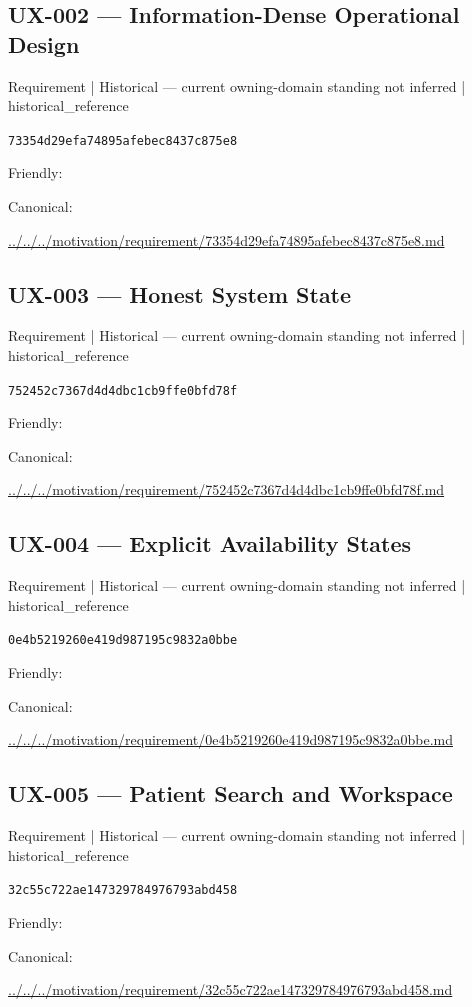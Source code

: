 \documentclass[10pt,a4paper]{article}
\begin{document}
\subsection*{UX-002 — Information-Dense Operational Design}
{\small Requirement | Historical — current owning-domain standing not inferred | historical\_reference}\par
\texttt{73354d29efa74895afebec8437c875e8}\par
Friendly: \par
Canonical: \par
{\footnotesize\url{../../../motivation/requirement/73354d29efa74895afebec8437c875e8.md}}\par
\subsection*{UX-003 — Honest System State}
{\small Requirement | Historical — current owning-domain standing not inferred | historical\_reference}\par
\texttt{752452c7367d4d4dbc1cb9ffe0bfd78f}\par
Friendly: \par
Canonical: \par
{\footnotesize\url{../../../motivation/requirement/752452c7367d4d4dbc1cb9ffe0bfd78f.md}}\par
\subsection*{UX-004 — Explicit Availability States}
{\small Requirement | Historical — current owning-domain standing not inferred | historical\_reference}\par
\texttt{0e4b5219260e419d987195c9832a0bbe}\par
Friendly: \par
Canonical: \par
{\footnotesize\url{../../../motivation/requirement/0e4b5219260e419d987195c9832a0bbe.md}}\par
\subsection*{UX-005 — Patient Search and Workspace}
{\small Requirement | Historical — current owning-domain standing not inferred | historical\_reference}\par
\texttt{32c55c722ae147329784976793abd458}\par
Friendly: \par
Canonical: \par
{\footnotesize\url{../../../motivation/requirement/32c55c722ae147329784976793abd458.md}}\par
\end{document}
